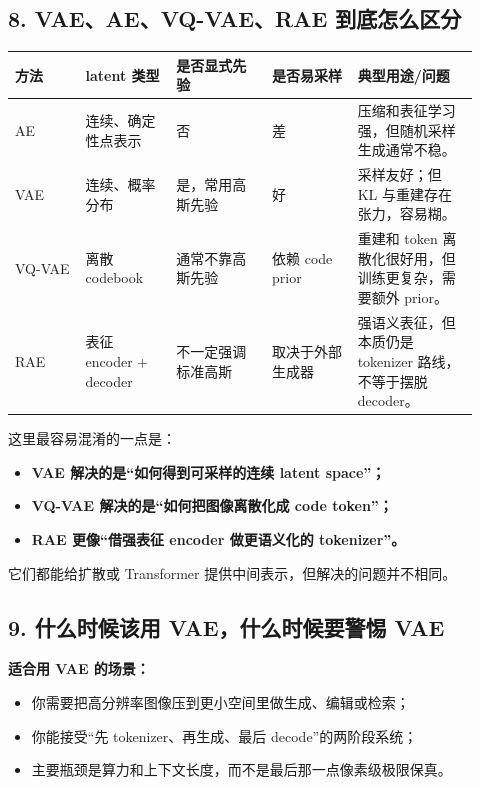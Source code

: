 \subsection{8. VAE、AE、VQ-VAE、RAE 到底怎么区分}

\begin{center}
\footnotesize
\setlength{\tabcolsep}{4pt}
\begin{tabular}{p{0.14\linewidth} p{0.18\linewidth} p{0.19\linewidth} p{0.17\linewidth} p{0.24\linewidth}}
\toprule
\textbf{方法} & \textbf{latent 类型} & \textbf{是否显式先验} & \textbf{是否易采样} & \textbf{典型用途/问题}\\
\midrule
AE & 连续、确定性点表示 & 否 & 差 & 压缩和表征学习强，但随机采样生成通常不稳。\\
VAE & 连续、概率分布 & 是，常用高斯先验 & 好 & 采样友好；但 KL 与重建存在张力，容易糊。\\
VQ-VAE & 离散 codebook & 通常不靠高斯先验 & 依赖 code prior & 重建和 token 离散化很好用，但训练更复杂，需要额外 prior。\\
RAE & 表征 encoder + decoder & 不一定强调标准高斯 & 取决于外部生成器 & 强语义表征，但本质仍是 tokenizer 路线，不等于摆脱 decoder。\\
\bottomrule
\end{tabular}
\end{center}

这里最容易混淆的一点是：

\begin{itemize}[leftmargin=1.5em]
  \item \textbf{VAE 解决的是“如何得到可采样的连续 latent space”；}
  \item \textbf{VQ-VAE 解决的是“如何把图像离散化成 code token”；}
  \item \textbf{RAE 更像“借强表征 encoder 做更语义化的 tokenizer”。}
\end{itemize}

它们都能给扩散或 Transformer 提供中间表示，但解决的问题并不相同。

\subsection{9. 什么时候该用 VAE，什么时候要警惕 VAE}

\textbf{适合用 VAE 的场景：}

\begin{itemize}[leftmargin=1.5em]
  \item 你需要把高分辨率图像压到更小空间里做生成、编辑或检索；
  \item 你能接受“先 tokenizer、再生成、最后 decode”的两阶段系统；
  \item 主要瓶颈是算力和上下文长度，而不是最后那一点像素级极限保真。
\end{itemize}

